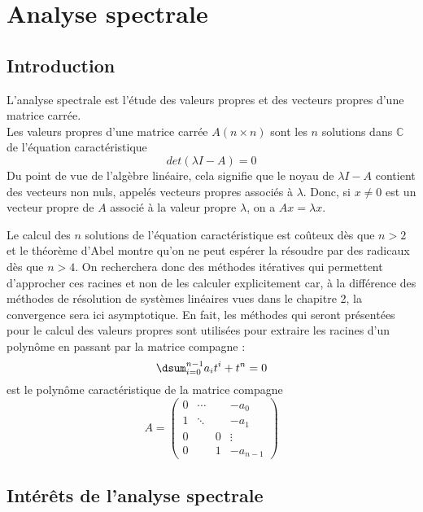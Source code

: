 \chapter {Analyse spectrale}

\section{Introduction}

L'analyse spectrale est l'étude des valeurs propres et des vecteurs propres d'une matrice carrée. \\
Les valeurs propres
d'une matrice carrée $A (n\times n)$ sont les $n$ solutions dans $\mathbb{C}$ de l'équation caractéristique
$$det(\lambda I-A) = 0$$
Du point de vue de l'algèbre linéaire, cela signifie que le noyau de $\lambda I-A$ contient des vecteurs non nuls, appelés vecteurs propres associés à $\lambda$.
Donc, si $x\neq 0$ est un vecteur propre  de $A$ associé à la valeur propre $\lambda$,
on a $Ax=\lambda x$.

Le calcul des $n$ solutions de l'équation caractéristique est coûteux dès que $n>2$ et le théorème d'Abel montre qu'on ne peut 
espérer la résoudre par des radicaux
dès que $n>4$. On recherchera donc des méthodes itératives qui permettent d'approcher ces racines et non de les calculer explicitement car, à la différence des méthodes de résolution de systèmes linéaires vues dans le chapitre 2, la convergence sera ici asymptotique. En fait, les méthodes qui seront présentées pour le calcul des valeurs propres sont utilisées pour extraire les racines d'un polynôme en passant par la matrice compagne :  
$$\dsum_{i=0}^{n-1}a_it^i+t^n = 0$$
est le polynôme caractéristique
de la matrice compagne
$$A =
\left (
\begin{array}{llll}
0 & \cdots &  &-a_0\\
1  &\ddots && -a_1\\
0 & & 0 &\vdots\\
0 & & 1 & -a_{n-1}
\end{array}
\right )
$$ 

\section{Intérêts de l'analyse spectrale} %

